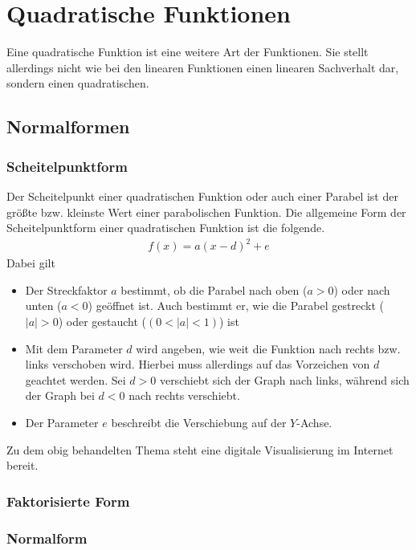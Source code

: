 \section{Quadratische Funktionen}
Eine quadratische Funktion ist eine weitere Art der Funktionen. Sie stellt allerdings nicht wie bei den linearen Funktionen einen linearen Sachverhalt dar, sondern einen quadratischen. 
\subsection{Normalformen}
\subsubsection{Scheitelpunktform}
Der Scheitelpunkt einer quadratischen Funktion oder auch einer Parabel ist der größte bzw. kleinste Wert einer parabolischen Funktion. Die allgemeine Form der Scheitelpunktform einer quadratischen Funktion ist die folgende. 
\begin{align*}
	f(x)=a(x-d)^2+e
\end{align*}
Dabei gilt
\begin{itemize}
	\item Der Streckfaktor $a$ bestimmt, ob die Parabel nach oben ($a>0$) oder nach unten ($a<0$) geöffnet ist. Auch bestimmt er, wie die Parabel gestreckt ($|a|>0$) oder gestaucht ($(0<|a|<1)$) ist
	\item Mit dem Parameter $d$ wird angeben, wie weit die Funktion nach rechts bzw. links verschoben wird. Hierbei muss allerdings auf das Vorzeichen von $d$ geachtet werden. Sei $d>0$ verschiebt sich der Graph nach links, während sich der Graph bei $d<0$ nach rechts verschiebt.
	\item Der Parameter $e$ beschreibt die Verschiebung auf der $Y$-Achse. 
\end{itemize}
Zu dem obig behandelten Thema steht eine digitale Visualisierung im Internet bereit. \href{https://www.geogebra.org/m/wfekxgxw}{\ExternalLink}

\subsubsection{Faktorisierte Form}
\subsubsection{Normalform}

